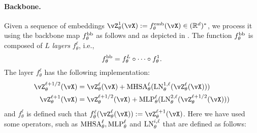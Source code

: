 \documentclass[\toplevelprefix/book-main.tex]{subfiles}
\begin{document}
\paragraph{Backbone.} Given a sequence of embeddings \(\vZ_{\theta}^{1}(\vX) := f_{\theta}^{\emb}(\vX) \in (\R^{d})^{*}\), we process it using the backbone map \(f_{\theta}^{\mathrm{bb}}\) as follows and as depicted in . The function \(f_{\theta}^{\mathrm{bb}}\) is composed of \(L\) \textit{layers} \(f_{\theta}^{\ell}\), i.e.,
\begin{equation}
    f_{\theta}^{\mathrm{bb}} = f_{\theta}^{L} \circ \cdots \circ f_{\theta}^{1}.
\end{equation}
 The layer \(f_{\theta}^{\ell}\) has the following implementation:
\begin{align}\label{eq:vit-res-block}
    \vZ_{\theta}^{\ell + 1/2}(\vX)
    &= \vZ_{\theta}^{\ell}(\vX) + \MHSA_{\theta}^{\ell}(\LN_{\theta}^{1, \ell}(\vZ_{\theta}^{\ell}(\vX))) \\ 
    \vZ_{\theta}^{\ell + 1}(\vX)
    &= \vZ_{\theta}^{\ell + 1/2}(\vX) + \MLP_{\theta}^{\ell}(\LN_{\theta}^{2, \ell}(\vZ_{\theta}^{\ell + 1/2}(\vX)))
\end{align}
and \(f_{\theta}^{\ell}\) is defined such that \(f_{\theta}^{\ell}(\vZ_{\theta}^{\ell}(\vX)) := \vZ_{\theta}^{\ell + 1}(\vX)\). Here we have used some operators, such as \(\operatorname{MHSA}_{\theta}^{\ell}, \operatorname{MLP}_{\theta}^{\ell}\) and \(\operatorname{LN}_{\theta}^{i, \ell}\) that are defined as follows:
\end{document}
